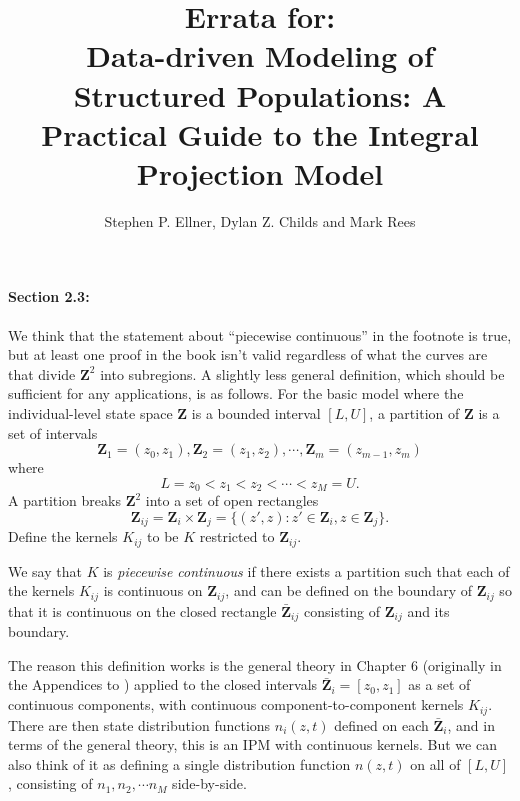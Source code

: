 \documentclass[12pt]{article}
\numberwithin{Box}{section}
\def\Z{\mathbf{Z}}
\newcommand{\be}{\begin{equation}}
\newcommand{\ee}{\end{equation}}
\begin{document}
\author{Stephen P. Ellner, Dylan Z. Childs and Mark Rees}
\title{Errata for: \\ Data-driven Modeling of Structured Populations: 
A Practical Guide to the Integral Projection Model} 

\maketitle

\paragraph{Section 2.3:} We think that the statement about ``piecewise continuous'' in the footnote is true, but at least one proof in the book isn't valid regardless of what the curves are that divide $\Z^2$ into subregions. A slightly less general definition, which should be sufficient for any applications, is as follows. For the basic
model where the individual-level state space $\Z$ is a 
bounded interval $[L,U]$, a partition of $\Z$ is a set of 
intervals 
\begin{equation}
\Z_1 = (z_0,z_1), \Z_2 = (z_1,z_2), \cdots, \Z_m = (z_{m-1},z_m) 
\end{equation}
where 
\be
L=z_0 < z_1 < z_2 < \cdots < z_M=U. 
\ee
A partition breaks $\Z^2$ into a set of open rectangles 
$$\Z_{ij} = \Z_i \times \Z_j = \{(z',z): z' \in \Z_i, z \in \Z_j\}.$$
Define the kernels $K_{ij}$ to be $K$ restricted to $\Z_{ij}$. 

We say that $K$ is \emph{piecewise continuous} if there exists a 
partition such that each of the kernels $K_{ij}$ is continuous on $\Z_{ij}$, 
and can be defined on the boundary of $\Z_{ij}$ so that it is continuous
on the closed rectangle $\bar{\Z}_{ij}$ consisting of $\Z_{ij}$ and its boundary.  

The reason this definition works is the general theory in Chapter 6
(originally in the Appendices to \citet{ellner-rees-2006}) applied to the  
closed intervals $\bar{\Z}_{i} =  [z_0,z_1]$ as a set of continuous components, 
with continuous component-to-component kernels $K_{ij}$. There are then state distribution 
functions $n_i(z,t)$ defined on each $\bar{\Z}_i$, and in terms of the general     
theory, this is an IPM with continuous kernels. But we can also think of it as defining a 
single distribution function $n(z,t)$ on all of $[L,U]$, consisting of $n_1,n_2, \cdots n_M$ 
side-by-side. 
\end{document}
